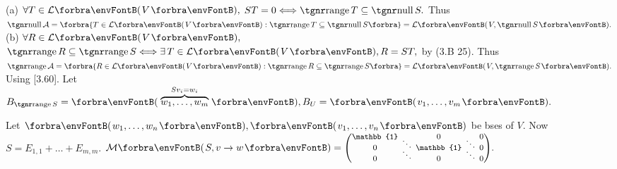 (a) %
{$\forall T\in\Lm{V},$ $ST=0\Longleftrightarrow \range T\subseteq\null S.$}\parSol{\Ha}
{Thus $\null\mathcal{A}=\Bra{T\in\Lm{V}:\range T\subseteq\null S}=\Lm{V,\null S}.$}\parSol{\vspace{2pt}}
(b) %
{$\forall R\in\Lm{V},$ $\range R\subseteq\range S \Longleftrightarrow\exists\,T\in\Lm{V},R=ST,$ by (3.B 25).}\parSol{\Hb}
{Thus $\range\mathcal{A}=\Bra{R\in\Lm{V}:\range R\subseteq\range S}=\Lm{V,\range S}.$}\FontNorm\PfEnd\vspace{14pt}\quad
\Or Using {\NOTEFOR} [3.60]. \;Let $B_{\range S}=\Par{\overbrace{w_1,\dots,w_m}^{Sv_i=w_i}},B_{U}=\Par{v_1,\dots,v_m}.$\par\vspace{-10pt}\quad
Let $\Par{w_1,\dots,w_n},\Par{v_1,\dots,v_n}$ be bses of $V.$ Now $S=E_{1,1}+\dots+E_{m,m}.$ $\Mt{S,v\rightarrow w}={\footnotesize\begin{pmatrix} \mathbb{1} &\hspace{-6pt}  &\hspace{-6pt} 0 &\hspace{-6pt}  &\hspace{-6pt} 0\\[-8pt]
		&\hspace{-6pt} \ddots &\hspace{-6pt}  &\hspace{-6pt} \ddots &\hspace{-6pt} \\[-8pt]
		0 &\hspace{-6pt}  &\hspace{-6pt} \mathbb{1} &\hspace{-6pt}  &\hspace{-6pt} 0\\[-8pt]
		&\hspace{-6pt} \ddots &\hspace{-6pt}  &\hspace{-6pt} \ddots &\hspace{-6pt} \\[-8pt]
		0 &\hspace{-6pt}  &\hspace{-6pt} 0 &\hspace{-6pt}  &\hspace{-6pt} 0\end{pmatrix}}.$\par\vspace{-6pt}\quad
